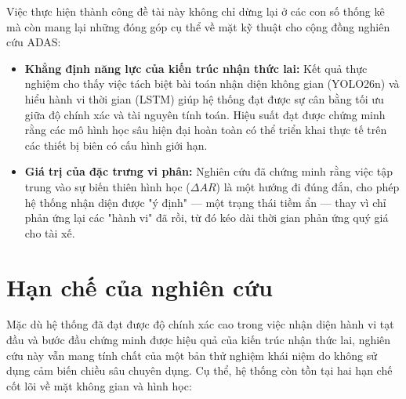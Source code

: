 	Việc thực hiện thành công đề tài này không chỉ dừng lại ở các con số thống kê mà còn mang lại những đóng góp cụ thể về mặt kỹ thuật cho cộng đồng nghiên cứu ADAS:
	\begin{itemize}
    	\item \textbf{Khẳng định năng lực của kiến trúc nhận thức lai:} Kết quả thực nghiệm cho thấy việc tách biệt bài toán nhận diện không gian (YOLO26n) và hiểu hành vi thời gian (LSTM) giúp hệ thống đạt được sự cân bằng tối ưu giữa độ chính xác và tài nguyên tính toán. Hiệu suất đạt được chứng minh rằng các mô hình học sâu hiện đại hoàn toàn có thể triển khai thực tế trên các thiết bị biên có cấu hình giới hạn.
    	\item \textbf{Giá trị của đặc trưng vi phân:} Nghiên cứu đã chứng minh rằng việc tập trung vào sự biến thiên hình học ($\Delta AR$) là một hướng đi đúng đắn, cho phép hệ thống nhận diện được "ý định" — một trạng thái tiềm ẩn — thay vì chỉ phản ứng lại các "hành vi" đã rồi, từ đó kéo dài thời gian phản ứng quý giá cho tài xế.
	\end{itemize}
	
	\section{Hạn chế của nghiên cứu}
	Mặc dù hệ thống đã đạt được độ chính xác cao trong việc nhận diện hành vi tạt đầu và bước đầu chứng minh được hiệu quả của kiến trúc nhận thức lai, nghiên cứu này vẫn mang tính chất của một bản thử nghiệm khái niệm do không sử dụng cảm biến chiều sâu chuyên dụng. Cụ thể, hệ thống còn tồn tại hai hạn chế cốt lõi về mặt không gian và hình học:
	
